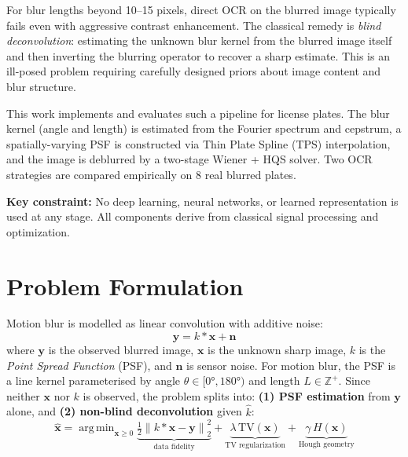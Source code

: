 \documentclass[12pt,a4paper]{article}
\DeclareMathOperator*{\argmin}{arg\,min}
\newcommand{\norm}[1]{\left\lVert#1\right\rVert}
\begin{document}
For blur lengths beyond 10--15 pixels, direct OCR on the blurred image typically fails even
with aggressive contrast enhancement. The classical remedy is \emph{blind deconvolution}:
estimating the unknown blur kernel from the blurred image itself and then inverting the
blurring operator to recover a sharp estimate. This is an ill-posed problem requiring
carefully designed priors about image content and blur structure.

This work implements and evaluates such a pipeline for license plates.
The blur kernel (angle and length) is estimated from the Fourier spectrum and cepstrum,
a spatially-varying PSF is constructed via Thin Plate Spline (TPS) interpolation,
and the image is deblurred by a two-stage Wiener + HQS solver. Two OCR strategies are
compared empirically on 8 real blurred plates.

\textbf{Key constraint:} No deep learning, neural networks, or learned representation
is used at any stage. All components derive from classical signal processing and optimization.

\section{Problem Formulation}

Motion blur is modelled as linear convolution with additive noise:
\begin{equation}
  \mathbf{y} = k \ast \mathbf{x} + \mathbf{n}
  \label{eq:degradation}
\end{equation}
where $\mathbf{y}$ is the observed blurred image, $\mathbf{x}$ is the unknown sharp image,
$k$ is the \emph{Point Spread Function} (PSF), and $\mathbf{n}$ is sensor noise.
For motion blur, the PSF is a line kernel parameterised by angle $\theta \in [0°, 180°)$
and length $L \in \mathbb{Z}^+$.
Since neither $\mathbf{x}$ nor $k$ is observed, the problem splits into:
\textbf{(1) PSF estimation} from $\mathbf{y}$ alone, and
\textbf{(2) non-blind deconvolution} given $\hat{k}$:
\begin{equation}
  \hat{\mathbf{x}} = \argmin_{\mathbf{x} \geq 0}
    \underbrace{\tfrac{1}{2}\norm{k \ast \mathbf{x} - \mathbf{y}}^2_2}_{\text{data fidelity}}
    + \underbrace{\lambda\,\mathrm{TV}(\mathbf{x})}_{\text{TV regularization}}
    + \underbrace{\gamma\,H(\mathbf{x})}_{\text{Hough geometry}}
  \label{eq:objective}
\end{equation}
\end{document}
